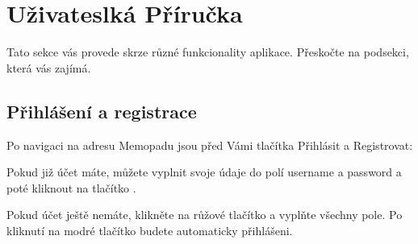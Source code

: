 \section{Uživateslká Příručka}

Tato sekce vás provede skrze různé funkcionality aplikace. Přeskočte na
podsekci, která vás zajímá.

\subsection{Přihlášení a registrace}

Po navigaci na adresu Memopadu jsou před Vámi tlačítka Přihlásit a Registrovat:

Pokud již účet máte, můžete vyplnit svoje údaje do polí username a password a
poté kliknout na tlačítko .

Pokud účet ještě nemáte, klikněte na růžové tlačítko  a vyplňte
všechny pole. Po kliknutí na modré tlačítko  budete automaticky
přihlášeni.


